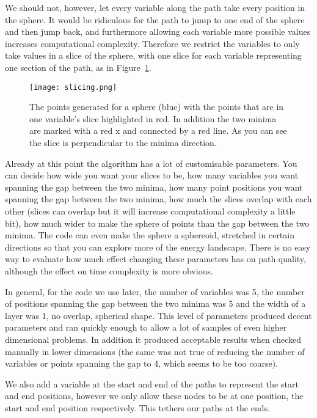 We should not, however, let every variable along the path take every position in the sphere.
It would be ridiculous for the path to jump to one end of the sphere and then jump back, and furthermore allowing each variable more possible values increases computational complexity.
Therefore we restrict the variables to only take values in a slice of the sphere, with one slice for each variable representing one section of the path, as in Figure~\ref{fig:slice_samp}.

\begin{figure}[h]
    \centering
    \texttt{[image: slicing.png]}
    \caption{The points generated for a sphere (blue) with the points that are in one variable's slice highlighted in red. In addition the two minima are marked with a red x and connected by a red line. As you can see the slice is perpendicular to the minima direction.}
    \label{fig:slice_samp}
\end{figure}

Already at this point the algorithm has a lot of customisable parameters.
You can decide how wide you want your slices to be, how many variables you want spanning the gap between the two minima, how many point positions you want spanning the gap between the two minima, how much the slices overlap with each other (slices can overlap but it will increase computational complexity a little bit), how much wider to make the sphere of points than the gap between the two minima.
The code can even make the sphere a sphereoid, stretched in certain directions so that you can explore more of the energy landscape.
There is no easy way to evaluate how much effect changing these parameters has on path quality, although the effect on time complexity is more obvious.

In general, for the code we use later, the number of variables was 5, the number of positions spanning the gap between the two minima was 5 and the width of a layer was 1, no overlap, spherical shape.
This level of parameters produced decent parameters and ran quickly enough to allow a lot of samples of even higher dimensional problems.
In addition it produced acceptable results when checked manually in lower dimensions (the same was not true of reducing the number of variables or points spanning the gap to 4, which seems to be too coarse).

We also add a variable at the start and end of the paths to represent the start and end positions, however we only allow these nodes to be at one position, the start and end position respectively. 
This tethers our paths at the ends.

